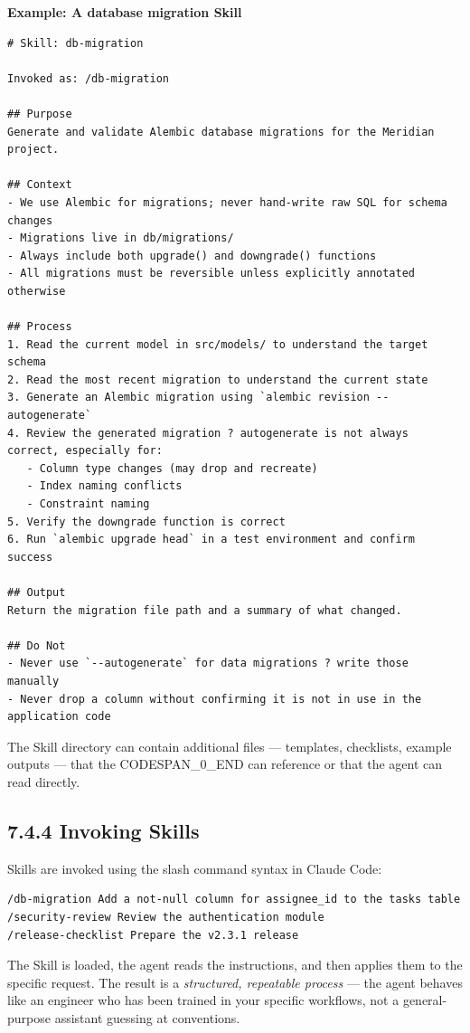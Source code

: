 \documentclass[11pt,a4paper]{book}
\begin{document}
\textbf{Example: A database migration Skill}

\begin{lstlisting}
# Skill: db-migration

Invoked as: /db-migration

## Purpose
Generate and validate Alembic database migrations for the Meridian project.

## Context
- We use Alembic for migrations; never hand-write raw SQL for schema changes
- Migrations live in db/migrations/
- Always include both upgrade() and downgrade() functions
- All migrations must be reversible unless explicitly annotated otherwise

## Process
1. Read the current model in src/models/ to understand the target schema
2. Read the most recent migration to understand the current state
3. Generate an Alembic migration using `alembic revision --autogenerate`
4. Review the generated migration ? autogenerate is not always correct, especially for:
   - Column type changes (may drop and recreate)
   - Index naming conflicts
   - Constraint naming
5. Verify the downgrade function is correct
6. Run `alembic upgrade head` in a test environment and confirm success

## Output
Return the migration file path and a summary of what changed.

## Do Not
- Never use `--autogenerate` for data migrations ? write those manually
- Never drop a column without confirming it is not in use in the application code
\end{lstlisting}

The Skill directory can contain additional files --- templates, checklists, example outputs --- that the CODESPAN\_0\_END can reference or that the agent can read directly.

\subsection{7.4.4 Invoking Skills}

Skills are invoked using the slash command syntax in Claude Code:

\begin{lstlisting}
/db-migration Add a not-null column for assignee_id to the tasks table
/security-review Review the authentication module
/release-checklist Prepare the v2.3.1 release
\end{lstlisting}

The Skill is loaded, the agent reads the instructions, and then applies them to the specific request. The result is a \textit{structured, repeatable process} --- the agent behaves like an engineer who has been trained in your specific workflows, not a general-purpose assistant guessing at conventions.
\end{document}

